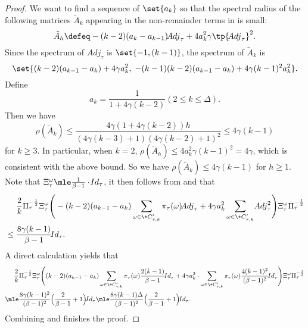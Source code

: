\documentclass[a4paper,11pt]{article}
\begin{document}
\begin{proof}
We want to find a sequence of $\set{a_k}$
so that the spectral radius of the following matrices
$\tilde A_k$ appearing in the non-remainder terms in  is small:
\[
	\tilde A_h\defeq -(k-2)(a_{k}-a_{k-1})\!{Adj}_\tau + 4a_k^2\gamma\tp{\!{Adj}_\tau}^2.
\]
Since the spectrum of $\!{Adj}_\tau$ is $\set{-1, (k-1)}$, the spectrum of $\tilde A_k$ is
\[
	\set{
		(k-2)(a_{k-1}-a_k) + 4\gamma a_k^2, \;
		-(k-1)(k-2)(a_{k-1}-a_k) + 4\gamma (k-1)^2 a_k^2
	}.
\]
Define
\[
	a_k = \frac{1}{1+4\gamma(k-2)} (2\leq k \leq \Delta).
\]
Then we have
\begin{equation}\label{eqn:spectral-radius-of-A}
	\rho(\tilde A_k)\le \frac{4 \gamma  (1+4\gamma(k-2)) h}{(4 \gamma  (k-3)+1) (4 \gamma  (k-2)+1)^2}\le 4\gamma (k-1)
\end{equation}
for $k \geq 3$. In particular, when $k=2$, $\rho(\tilde A_h)\leq 4a_k^2 \gamma (k-1)^2 = 4\gamma$,
which is consistent with the above bound.
So we have $\rho(\tilde A_k)\leq 4\gamma (k-1)$ for $h\geq 1$.
Note that $\Xi_\tau^{\omega}\mle \frac{1}{\beta-1}\cdot \!{Id}_{\tau}$,
it then follows from  and  that 
\begin{align}\label{eqn:bound-adj}
	&\phantom{{}={}}
	\frac{2}{k}
    \Pi_\tau^{-\frac{1}{2}}
    \Xi_\tau^{\omega}
    \Bigg(
    -(k-2)
    (a_{k-1}-a_k)
    \sum_{\omega\in\+C'_{\tau,k}}
      \pi_\tau(\omega)
      \!{Adj}_\tau
    +
    4\gamma a_k^2
    \sum_{\omega\in \+C'_{\tau,k}}
      \!{Adj}^2_\tau
    \Bigg)
    \Xi_{\tau}^{\omega}
    \Pi_\tau^{-\frac{1}{2}}
    \notag
    \\&\le \frac{8\gamma (k-1)}{\beta-1} \!{Id}_\tau.
\end{align}
A direct calculation yields that
\begin{align}\label{eqn:bound-remainder}
    &\phantom{{}={}}
	\frac{2}{k}
    \Pi_\tau^{-\frac{1}{2}}
    \Xi_\tau^{\omega}
    \Bigg(
    (k-2)
    (a_{k-1}-a_k)
    \sum_{\omega\in\+C'_{\tau,k}}
      \pi_\tau(\omega)
      \frac{2(k-1)}{\beta-1}\!{Id}_\tau
    +
    4\gamma a_k^2 \cdot
    \sum_{\omega\in \+C'_{\tau,k}}
      \pi_\tau(\omega)
      \frac{4(k-1)^2}{(\beta-1)^2}\!{Id}_\tau
    \Bigg)
    \Xi_{\tau}^{\omega}
    \Pi_\tau^{-\frac{1}{2}}
    \notag
    \\&\mle
    \frac{8\gamma(k-1)^2}{(\beta-1)^2}\Big(\frac{2}{\beta-1} + 1\Big)\!{Id}_\tau
    \mle
    \frac{8\gamma(k-1)\Delta}{(\beta-1)^2}\Big(\frac{2}{\beta-1} + 1\Big)\!{Id}_\tau.
\end{align}
Combining  and  finishes the proof.
\end{proof}
\end{document}
